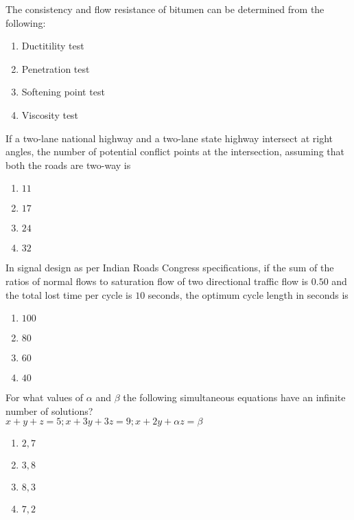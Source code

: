 \iffalse
\chapter{2007}
\author{AI24BTECH11020}
\section{ce}
\fi

	\item The consistency and flow resistance of bitumen can be determined from the following:
	\begin{enumerate}
		\item Ductitility test
		\item Penetration test
		\item Softening point test
		\item Viscosity test
	\end{enumerate}
\item If a two-lane national highway and a two-lane state highway intersect at right angles, the number of potential conflict points at the intersection, assuming that both the roads are two-way is 
	\begin{enumerate}
                \item $11$
                \item $17$
		\item $24$
                \item $32$
        \end{enumerate}
\item In signal design as per Indian Roads Congress specifications, if the sum of the ratios of normal flows to saturation flow of two directional traffic flow is $0.50$ and the total lost time per cycle is $10$ seconds, the optimum cycle length in seconds is 
	\begin{enumerate}
                \item $100$
                \item $80$
                \item $60$
                \item $40$
        \end{enumerate}
\item For what values of $\alpha$ and $\beta$ the following simultaneous equations have an infinite number of solutions?\\ $x+y+z=5;  x+3y+3z=9;  x+2y+\alpha z= \beta$
	\begin{enumerate}
                \item $2,7$
                \item $3,8$
                \item $8,3$
                \item $7,2$
        \end{enumerate}
